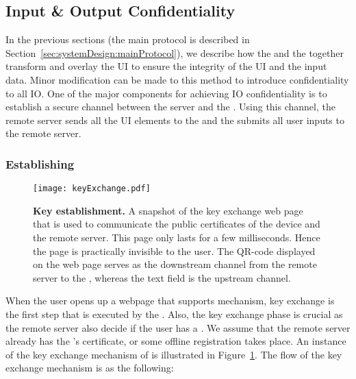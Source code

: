 \subsection{Input \& Output Confidentiality}
\label{sec:systemDesign:confidentiality}


In the previous sections (the main protocol is described in Section~\ref{sec:systemDesign:mainProtocol}), we describe how the \name \js and the \device together transform and overlay the UI to ensure the integrity of the UI and the input data. Minor modification can be made to this method to introduce confidentiality to all IO. One of the major components for achieving IO confidentiality is to establish a secure channel between the server and the \device. Using this \tls channel, the remote server sends all the UI elements to the \device and the \device submits all user inputs to the remote server.

\subsubsection{\bfseries Establishing \tls}
\label{sec:systemDesign:confidentiality:tls}

\begin{figure}[t]
\centering
\texttt{[image: keyExchange.pdf]}
\caption{\textbf{Key establishment.} A snapshot of the key exchange web page that is used to communicate the public certificates of the device and the remote server. This page only lasts for a few milliseconds. Hence the page is practically invisible to the user. The QR-code displayed on the web page serves as the downstream channel from the remote server to the \device, whereas the text field is the upstream channel.}
\spacesave
\label{fig:keyExchange}
\centering
\end{figure} 


When the user opens up a webpage that supports \name mechanism, key exchange is the first step that is executed by the \device. Also, the key exchange phase is crucial as the remote server also decide if the user has a \device. We assume that the remote server already has the \device's certificate, or some offline registration takes place. An instance of the key exchange mechanism of \name is illustrated in Figure~\ref{fig:keyExchange}. The flow of the key exchange mechanism is as the following:


